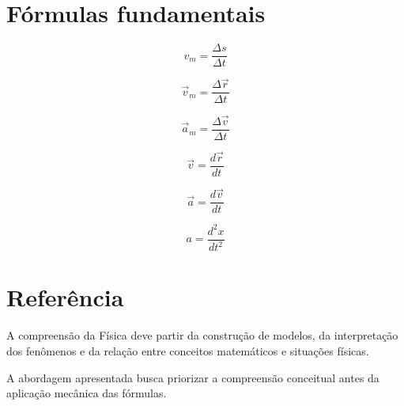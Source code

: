 \documentclass[a4paper,12pt]{article}
\newcommand{\printingbibliography}{%
    \pagestyle{myheadings}
    \markright{}
    \sloppy
    \printbibliography[
        heading=bibintoc,
        title=Referências
    ]
    \fussy
}
\begin{document}
\section{Fórmulas fundamentais}

\begin{center}

\[
\boxed{
v_m=
\frac{\Delta s}{\Delta t}
}
\]

\vspace{0.3cm}

\[
\boxed{
\vec v_m=
\frac{\Delta\vec r}{\Delta t}
}
\]

\vspace{0.3cm}

\[
\boxed{
\vec a_m=
\frac{\Delta\vec v}{\Delta t}
}
\]

\vspace{0.3cm}

\[
\boxed{
\vec v=
\frac{d\vec r}{dt}
}
\]

\vspace{0.3cm}

\[
\boxed{
\vec a=
\frac{d\vec v}{dt}
}
\]

\vspace{0.3cm}

\[
\boxed{
a=
\frac{d^2x}{dt^2}
}
\]

\end{center}



\section*{Referência}

A compreensão da Física deve partir da construção de modelos,
da interpretação dos fenômenos e da relação entre conceitos
matemáticos e situações físicas.

A abordagem apresentada busca priorizar a compreensão conceitual
antes da aplicação mecânica das fórmulas.



\printingbibliography
\end{document}
